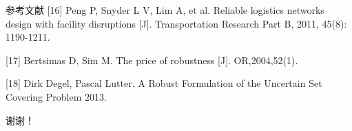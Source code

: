 \documentclass[10pt]{beamer}
\begin{document}
\begin{frame}[allowframebreaks]{参考文献}
[16] Peng P, Snyder L V, Lim A, et al. Reliable logistics networks design with facility disruptions [J]. Transportation Research Part B, 2011, 45(8): 1190-1211.

[17] Bertsimas D, Sim M. The price of robustness [J]. OR,2004,52(1).

[18] Dirk Degel, Pascal Lutter. A Robust Formulation of the Uncertain Set Covering Problem 2013.













\end{frame}

\begin{frame}

\begin{center}

  \Huge{谢谢！}
\end{center}

\end{frame}
\end{document}
